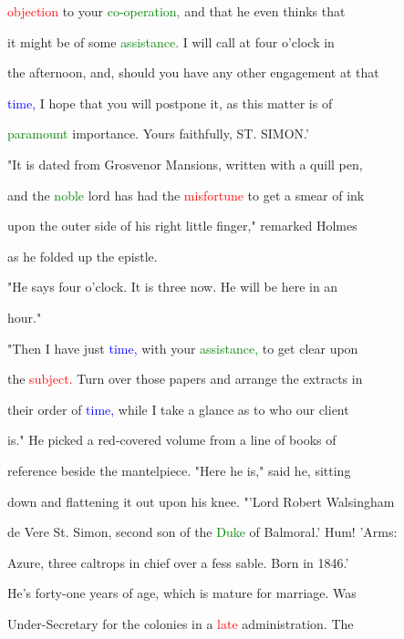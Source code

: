  \textcolor{red}{objection} to your \textcolor{green}{co-operation,} and that he even thinks that

 it might be of some \textcolor{green}{assistance.} I will call at four o'clock in

 the afternoon, and, should you have any other engagement at that

 \textcolor{blue}{time,} I \textcolor{BurntOrange}{hope} that you will postpone it, as this matter is of

 \textcolor{green}{paramount} \textcolor{BurntOrange}{importance.} Yours faithfully, ST. SIMON.'



 "It is dated from Grosvenor Mansions, written with a quill pen,

 and the \textcolor{green}{noble} \textcolor{BurntOrange}{lord} has had the \textcolor{red}{misfortune} to get a smear of ink

 upon the outer side of his right little finger," remarked Holmes

 as he folded up the epistle.



 "He says four o'clock. It is three now. He will be here in an

 hour."



 "Then I have just \textcolor{blue}{time,} with your \textcolor{green}{assistance,} to get clear upon

 the \textcolor{red}{subject.} Turn over those papers and arrange the extracts in

 their order of \textcolor{blue}{time,} while I take a glance as to who our client

 is." He picked a red-covered volume from a line of books of

 reference beside the mantelpiece. "Here he is," said he, sitting

 down and flattening it out upon his knee. \textcolor{BurntOrange}{"'Lord} Robert Walsingham

 de Vere St. Simon, second son of the \textcolor{green}{Duke} of Balmoral.' Hum! 'Arms:

 Azure, three caltrops in chief over a fess sable. Born in 1846.'

 He's forty-one years of age, which is mature for \textcolor{BurntOrange}{marriage.} Was

 Under-Secretary for the colonies in a \textcolor{red}{late} administration. The

